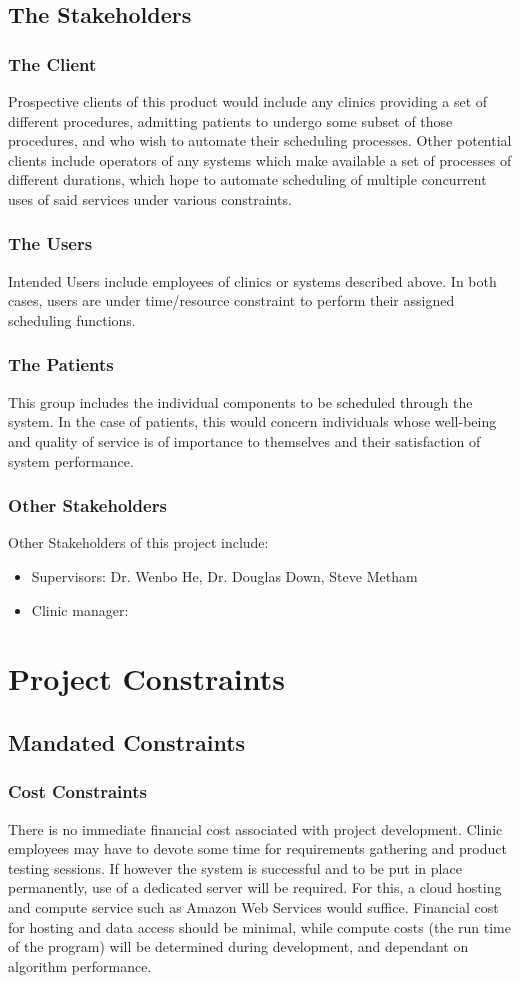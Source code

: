 \documentclass[12pt, titlepage]{article}
\begin{document}
\subsection{The Stakeholders}
\subsubsection{The Client}
Prospective clients of this product would include any clinics providing a set of different procedures, admitting patients to undergo some subset of those procedures, and who wish to automate their scheduling processes. Other potential clients include operators of any systems which make available a set of processes of different durations, which hope to automate scheduling of multiple concurrent uses of said services under various constraints.
\subsubsection{The Users}
Intended Users include employees of clinics or systems described above. In both cases, users are under time/resource constraint to perform their assigned scheduling functions.
\subsubsection{The Patients}
This group includes the individual components to be scheduled through the system. In the case of patients, this would concern individuals whose well-being and quality of service is of importance to themselves and their satisfaction of system performance.
\subsubsection{Other Stakeholders}
Other Stakeholders of this project include:
\begin{itemize}
  \item     Supervisors: Dr. Wenbo He, Dr. Douglas Down, Steve Metham
  \item 	Clinic manager: 
\end{itemize}

\section{Project Constraints}
\subsection{Mandated Constraints}
\subsubsection{Cost Constraints}
There is no immediate financial cost associated with project development. Clinic employees may have to devote some time for requirements gathering and product testing sessions. If however the system is successful and to be put in place permanently, use of a dedicated server will be required. For this, a cloud hosting and compute service such as Amazon Web Services would suffice. Financial cost for hosting and data access should be minimal, while compute costs (the run time of the program) will be determined during development, and dependant on algorithm performance.
\newline
\end{document}
